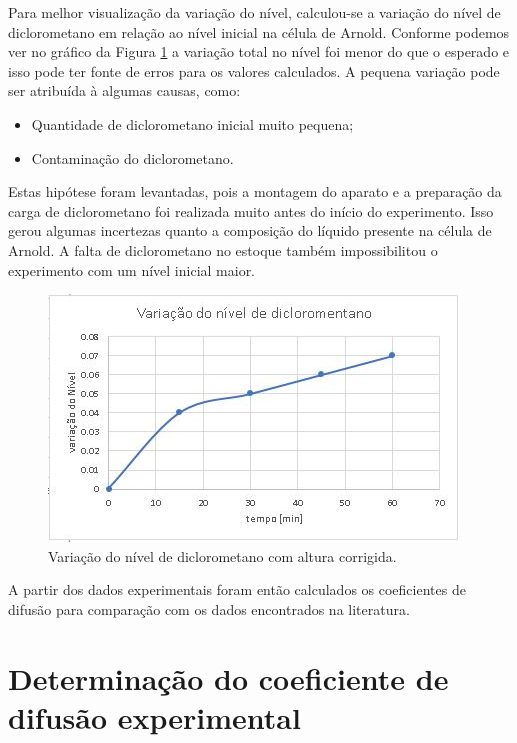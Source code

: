 Para melhor visualização da variação do nível, calculou-se a variação do nível de diclorometano em relação ao nível inicial na célula de Arnold. Conforme podemos ver no gráfico da Figura \ref{delta} a variação total no nível foi menor do que o esperado e isso pode ter fonte de erros para os valores calculados. A pequena variação pode ser atribuída à algumas causas, como:

\begin{itemize}
	\item Quantidade de diclorometano inicial muito pequena;
	\item Contaminação do diclorometano.
\end{itemize}

Estas hipótese foram levantadas, pois a montagem do aparato e a preparação da carga de diclorometano foi realizada muito antes do início do experimento. Isso gerou algumas incertezas quanto a composição do líquido presente na célula de Arnold. A falta de diclorometano no estoque também impossibilitou o experimento com um nível inicial maior.

\begin{figure}[H]
	\begin{center}
		\includegraphics[scale=1,trim={0 0 0 0}]{figuras/ladeq/difusao/delta}
		\caption{Variação do nível de diclorometano com altura corrigida.}
		\label{delta}
	\end{center}
\end{figure}


A partir dos dados experimentais foram então calculados os coeficientes de difusão para comparação com os dados encontrados na literatura.

\section{Determinação do coeficiente de difusão experimental}

